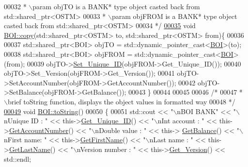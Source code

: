 \begin{DoxyCode}
00032 \textcolor{comment}{ * \(\backslash\)param objTO is a BANK* type object casted back from std::shared\_ptr<OSTM>}
00033 \textcolor{comment}{ * \(\backslash\)param objFROM is a BANK* type object casted back from std::shared\_ptr<OSTM>}
00034 \textcolor{comment}{ */}
\hypertarget{_b_o_i_8cpp_source.tex_l00035}{}\hyperlink{class_b_o_i_a9ff2d32c25c23a1bea6316f50c3bf677_a9ff2d32c25c23a1bea6316f50c3bf677}{00035} \textcolor{keywordtype}{void} \hyperlink{class_b_o_i_a9ff2d32c25c23a1bea6316f50c3bf677_a9ff2d32c25c23a1bea6316f50c3bf677}{BOI::copy}(std::shared\_ptr<OSTM> to, std::shared\_ptr<OSTM> from)\{
00036 
00037     std::shared\_ptr<BOI> objTO = std::dynamic\_pointer\_cast<\hyperlink{class_b_o_i}{BOI}>(to);
00038     std::shared\_ptr<BOI> objFROM = std::dynamic\_pointer\_cast<\hyperlink{class_b_o_i}{BOI}>(from);
00039     objTO->\hyperlink{class_o_s_t_m_ab5019a32185631c08abbf826422f2d93_ab5019a32185631c08abbf826422f2d93}{Set\_Unique\_ID}(objFROM->Get\_Unique\_ID());
00040     objTO->Set\_Version(objFROM->Get\_Version());
00041     objTO->SetAccountNumber(objFROM->GetAccountNumber());
00042     objTO->SetBalance(objFROM->GetBalance());
00043 \}
00044 
00045 
00046 \textcolor{comment}{/*}
00047 \textcolor{comment}{ *  \(\backslash\)brief toString function, displays the object values in formatted way}
00048 \textcolor{comment}{ */}
\hypertarget{_b_o_i_8cpp_source.tex_l00049}{}\hyperlink{class_b_o_i_ab02a4dd4ebcc5b2abfaca19f2dff2006_ab02a4dd4ebcc5b2abfaca19f2dff2006}{00049} \textcolor{keywordtype}{void} \hyperlink{class_b_o_i_ab02a4dd4ebcc5b2abfaca19f2dff2006_ab02a4dd4ebcc5b2abfaca19f2dff2006}{BOI::toString}()
00050 \{
00051    std::cout << \textcolor{stringliteral}{"\(\backslash\)nBOI BANK"} << \textcolor{stringliteral}{"\(\backslash\)nUnique ID : "} << this->\hyperlink{class_o_s_t_m_a5a01a8b98d16b1d1904ecf9356e7b71d_a5a01a8b98d16b1d1904ecf9356e7b71d}{Get\_Unique\_ID}() << \textcolor{stringliteral}{"\(\backslash\)nInt account : 
      "} << this->\hyperlink{class_b_o_i_a5b18e1538f3d37835234946cdf9f240f_a5b18e1538f3d37835234946cdf9f240f}{GetAccountNumber}() << \textcolor{stringliteral}{"\(\backslash\)nDouble value : "} << this->
      \hyperlink{class_b_o_i_a25b289dece2a1685bb9d1a9332c9be0b_a25b289dece2a1685bb9d1a9332c9be0b}{GetBalance}() << \textcolor{stringliteral}{"\(\backslash\)nFirst name: "} << this->\hyperlink{class_b_o_i_ab4b9d50c6008a666aa4382def580e7d1_ab4b9d50c6008a666aa4382def580e7d1}{GetFirstName}() << \textcolor{stringliteral}{"\(\backslash\)nLast name : "} << 
      this->\hyperlink{class_b_o_i_a37828f3fa4a32f522966e2cad90eaab2_a37828f3fa4a32f522966e2cad90eaab2}{GetLastName}()  << \textcolor{stringliteral}{"\(\backslash\)nVersion number : "} << this->\hyperlink{class_o_s_t_m_a1f1db9d482f22c8e7caa17dfb340626b_a1f1db9d482f22c8e7caa17dfb340626b}{Get\_Version}() << std::endl;

\end{DoxyCode}
